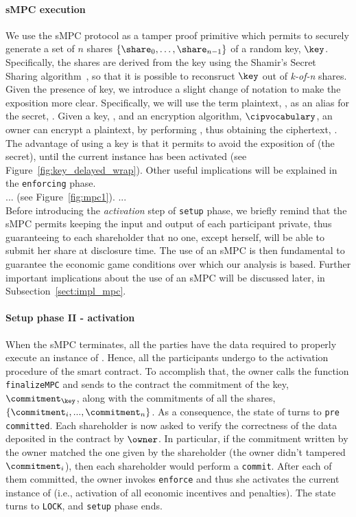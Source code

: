 \medskip

\paragraph*{sMPC execution}\label{sect:impl_mpc_brief}
We use the sMPC protocol as a tamper proof primitive which permits to securely generate a set of $n$ shares $\left\lbrace \share _0 , \ldots , \share_{n-1} 	\right\rbrace$ of a random key, $\key$. Specifically, the shares are derived from the key using the Shamir's Secret Sharing algorithm~\cite{Shamir:1979:SS:359168.359176}, so that it is possible to reconsruct $\key$ out of {\em k-of-n} shares.
Given the presence of key, we introduce a slight change of notation to make the exposition more clear. 
Specifically, we will use the term plaintext, \plaintext, as an alias for the secret, \secret. 
Given a key, \key, and an encryption algorithm, $\cipvocabulary$, an owner can encrypt a plaintext, \plaintext by performing \wrap, thus obtaining the ciphertext, \ciphertext. 
The advantage of using a key is that it permits to avoid the exposition of \plaintext (the secret), until the current \shortname instance has been activated (see Figure~\ref{fig:key_delayed_wrap}). Other useful implications will be explained in the \texttt{enforcing} phase. \\
...
(see Figure~\ref{fig:mpc1}).
... \\
Before introducing the {\em activation} step of \texttt{setup} phase, we briefly remind that the sMPC permits keeping the input and output of each participant private, thus guaranteeing to each shareholder that no one, except herself, will be able to submit her share at disclosure time. 
The use of an sMPC is then fundamental to guarantee the economic game conditions over which our analysis is based. Further important implications about the use of an sMPC will be discussed later, in Subsection~\ref{sect:impl_mpc}.

\medskip

\paragraph*{Setup phase II - activation}
When the sMPC terminates, all the parties have the data required to properly execute an instance of \shortname. 
Hence, all the participants undergo to the activation procedure of the smart contract. 
To accomplish that, the owner calls the function \texttt{finalizeMPC} and sends to the contract the commitment of the key, $ \commitment _\key $, along with the commitments of all the shares, $\{ \commitment _i , ... , \commitment _n \}$. 
As a consequence, the state of \shortname turns to \texttt{pre committed}. 
Each shareholder is now asked to verify the correctness of the data deposited in the contract by $\owner$. 
In particular, if the commitment written by the owner matched the one given by the shareholder (the owner didn't tampered $\commitment_i$), then each shareholder would perform a \texttt{commit}. 
After each of them committed, the owner invokes \texttt{enforce} and thus she activates the current instance of \shortname (i.e., activation of all economic incentives and penalties). 
The state turns to \texttt{LOCK}, and \texttt{setup} phase ends. 

